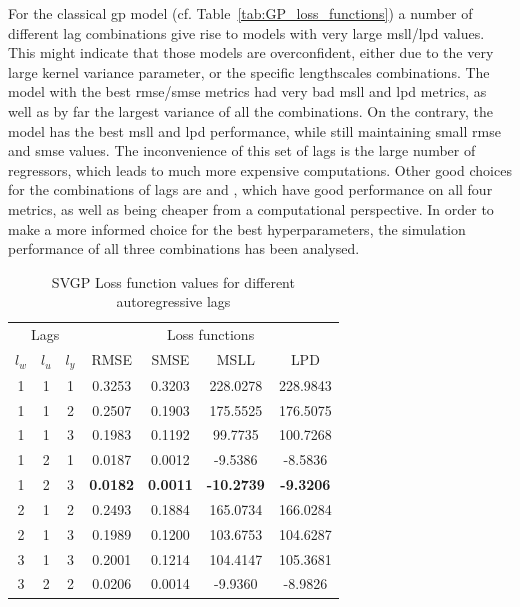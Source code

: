 For the classical \acrshort{gp} model (cf. Table~\ref{tab:GP_loss_functions}) a
number of different lag combinations give rise to models with very large
\acrshort{msll}/\acrshort{lpd} values. This might indicate that those models are
overconfident, either due to the very large kernel variance parameter, or the
specific lengthscales combinations. The model with the best
\acrshort{rmse}/\acrshort{smse} metrics  had very bad
\acrshort{msll} and \acrshort{lpd} metrics, as well as by far the largest
variance of all the combinations. On the contrary, the  model has
the best \acrshort{msll} and \acrshort{lpd} performance, while still maintaining
small \acrshort{rmse} and \acrshort{smse} values. The inconvenience of this set
of lags is the large number of regressors, which leads to much more expensive
computations. Other good choices for the combinations of lags are
 and , which have good performance on all four
metrics, as well as being cheaper from a computational perspective. In order to
make a more informed choice for the best hyperparameters, the simulation
performance of all three combinations has been analysed.

\clearpage

\begin{table}[ht]
\centering
    \begin{tabular}{||c c c|c c c c||}
        \hline
        \multicolumn{3}{||c|}{Lags} & \multicolumn{4}{c||}{Loss functions}\\
        $l_w$ & $l_u$ & $l_y$ & RMSE & SMSE & MSLL & LPD\\
        \hline \hline
        1 & 1 & 1 & 0.3253 & 0.3203 & 228.0278 & 228.9843 \\
        1 & 1 & 2 & 0.2507 & 0.1903 & 175.5525 & 176.5075 \\
        1 & 1 & 3 & 0.1983 & 0.1192 & 99.7735 & 100.7268 \\
        1 & 2 & 1 & 0.0187 & 0.0012 & -9.5386 & -8.5836 \\
        1 & 2 & 3 & \textbf{0.0182} & \textbf{0.0011} & \textbf{-10.2739} &
        \textbf{-9.3206} \\
        2 & 1 & 2 & 0.2493 & 0.1884 & 165.0734 & 166.0284 \\
        2 & 1 & 3 & 0.1989 & 0.1200 & 103.6753 & 104.6287 \\
        3 & 1 & 3 & 0.2001 & 0.1214 & 104.4147 & 105.3681 \\
        3 & 2 & 2 & 0.0206 & 0.0014 & -9.9360 & -8.9826 \\
        \hline
    \end{tabular}
\caption{SVGP Loss function values for different autoregressive lags}
\label{tab:SVGP_loss_functions}
\end{table}

